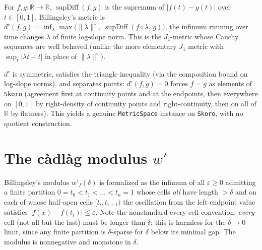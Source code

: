 \begin{definition}\label{def:sk-dcirc}
  \leanok
  For $f,g\colon\mathbb{R}\to\mathbb{R}$, $\operatorname{supDiff}(f,g)$ is the supremum of
  $|f(t)-g(t)|$ over $t\in[0,1]$.  Billingsley's metric is
  $d^\circ(f,g)=\inf_{\lambda}\max\bigl(\|\lambda\|^\circ,\;
  \operatorname{supDiff}(f\circ\lambda,\,g)\bigr)$, the infimum running over time changes
  $\lambda$ of finite log-slope norm.  This is the $J_1$-metric whose Cauchy sequences are
  well behaved (unlike the more elementary $J_1$ metric with
  $\sup_t|\lambda t-t|$ in place of $\|\lambda\|^\circ$).
\end{definition}

\begin{theorem}\label{thm:sk-metric}
  \leanok
  $d^\circ$ is symmetric, satisfies the triangle inequality (via the composition bound on
  log-slope norms), and separates points: $d^\circ(f,g)=0$ forces $f=g$ as elements of
  \texttt{Skoro} (agreement first at continuity points and at the endpoints, then
  everywhere on $[0,1]$ by right-density of continuity points and right-continuity, then
  on all of $\mathbb{R}$ by flatness).  This yields a genuine \texttt{MetricSpace}
  instance on \texttt{Skoro}, with no quotient construction.
\end{theorem}

\section{The c\`adl\`ag modulus \texorpdfstring{$w'$}{w'}}

\begin{definition}\label{def:sk-modulus}
  \leanok
  Billingsley's modulus $w'_f(\delta)$ is formalized as the infimum of all $\varepsilon\ge 0$
  admitting a finite partition $0=t_0<t_1<\dots<t_n=1$ whose cells \emph{all} have length
  $>\delta$ and on each of whose half-open cells $[t_i,t_{i+1})$ the oscillation from the
  left endpoint value satisfies $|f(x)-f(t_i)|\le\varepsilon$.  Note the nonstandard
  every-cell convention: \emph{every} cell (not all but the last) must be longer than
  $\delta$; this is harmless for the $\delta\to 0$ limit, since any finite partition is
  $\delta$-sparse for $\delta$ below its minimal gap.  The modulus is nonnegative and
  monotone in $\delta$.
\end{definition}

